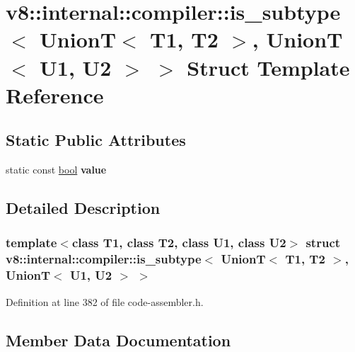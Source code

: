 \hypertarget{structv8_1_1internal_1_1compiler_1_1is__subtype_3_01UnionT_3_01T1_00_01T2_01_4_00_01UnionT_3_01U1_00_01U2_01_4_01_4}{}\section{v8\+:\+:internal\+:\+:compiler\+:\+:is\+\_\+subtype$<$ UnionT$<$ T1, T2 $>$, UnionT$<$ U1, U2 $>$ $>$ Struct Template Reference}
\label{structv8_1_1internal_1_1compiler_1_1is__subtype_3_01UnionT_3_01T1_00_01T2_01_4_00_01UnionT_3_01U1_00_01U2_01_4_01_4}
\subsection*{Static Public Attributes}
\begin{DoxyCompactItemize}
\item 
static const \mbox{\hyperlink{classbool}{bool}} {\bfseries value}
\end{DoxyCompactItemize}


\subsection{Detailed Description}
\subsubsection*{template$<$class T1, class T2, class U1, class U2$>$\newline
struct v8\+::internal\+::compiler\+::is\+\_\+subtype$<$ Union\+T$<$ T1, T2 $>$, Union\+T$<$ U1, U2 $>$ $>$}



Definition at line 382 of file code-\/assembler.\+h.



\subsection{Member Data Documentation}
\mbox{\label{structv8_1_1internal_1_1compiler_1_1is__subtype_3_01UnionT_3_01T1_00_01T2_01_4_00_01UnionT_3_01U1_00_01U2_01_4_01_4_aeda63a84892626c5ad6f532b452f0ad5}} 
